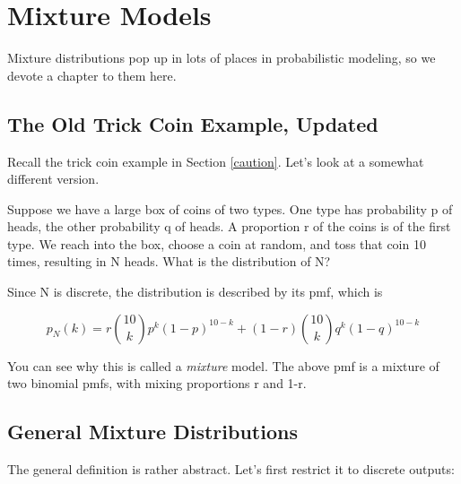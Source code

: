 \chapter{Mixture Models} 
\label{chap:mix}

Mixture distributions pop up in lots of places in probabilistic
modeling, so we devote a chapter to them here.

\section{The Old Trick Coin Example, Updated}
\label{oldtrick}

Recall the trick coin example in Section \ref{caution}.  Let's look at a
somewhat different version.

Suppose we have a large box of coins of two types. One type has
probability p of heads, the other probability q of heads. A proportion r
of the coins is of the first type. We reach into the box, choose a coin
at random, and toss that coin 10 times, resulting in N heads. What is
the distribution of N?

Since N is discrete, the distribution is described by its pmf, which is

\begin{equation}
\label{mixbinom}
p_N(k) = r \binom{10}{k} p^k (1-p)^{10-k} +
(1-r) \binom{10}{k} q^k (1-q)^{10-k}
\end{equation}

You can see why this is called a {\it mixture} model. The above pmf is a
mixture of two binomial pmfs, with mixing proportions r and 1-r.

\section{General Mixture Distributions}
\label{genmix}

The general definition is rather abstract.  Let's first restrict it to
discrete outputs:

